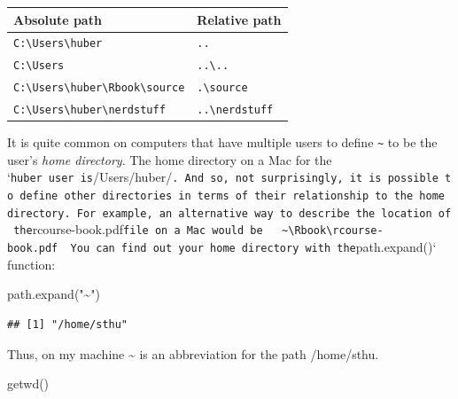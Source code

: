 \documentclass[
  12pt,
  oneside]{book}
\newenvironment{Shaded}{\begin{snugshade}}{\end{snugshade}}
\newcommand{\FunctionTok}[1]{\textcolor[rgb]{0.00,0.00,0.00}{#1}}
\newcommand{\NormalTok}[1]{#1}
\newcommand{\StringTok}[1]{\textcolor[rgb]{0.31,0.60,0.02}{#1}}
\theoremstyle{definition}
\theoremstyle{definition}
\theoremstyle{definition}
\theoremstyle{definition}
\theoremstyle{remark}
\begin{document}
\begin{longtable}[]{@{}ll@{}}
\toprule()
Absolute path & Relative path \\
\midrule()
\endhead
\texttt{C:\textbackslash{}Users\textbackslash{}huber} & \texttt{..} \\
\texttt{C:\textbackslash{}Users} & \texttt{..\textbackslash{}..} \\
\texttt{C:\textbackslash{}Users\textbackslash{}huber\textbackslash{}Rbook\textbackslash{}source} & \texttt{.\textbackslash{}source} \\
\texttt{C:\textbackslash{}Users\textbackslash{}huber\textbackslash{}nerdstuff} & \texttt{..\textbackslash{}nerdstuff} \\
\bottomrule()
\end{longtable}

It is quite common on computers that have multiple users to define \texttt{\textasciitilde{}} to be the user's \emph{home directory}. The home directory on a Mac for the `\texttt{huber\textquotesingle{}\textquotesingle{}\ user\ is}/Users/huber/\texttt{.\ And\ so,\ not\ surprisingly,\ it\ is\ possible\ to\ define\ other\ directories\ in\ terms\ of\ their\ relationship\ to\ the\ home\ directory.\ For\ example,\ an\ alternative\ way\ to\ describe\ the\ location\ of\ the}rcourse-book.pdf\texttt{file\ on\ a\ Mac\ would\ be\ \ \textasciigrave{}\textasciigrave{}\textasciigrave{}\ \textasciitilde{}\textbackslash{}Rbook\textbackslash{}rcourse-book.pdf\ \textasciigrave{}\textasciigrave{}\textasciigrave{}\ You\ can\ find\ out\ your\ home\ directory\ with\ the}path.expand()` function:

\begin{Shaded}
\begin{Highlighting}[]
\FunctionTok{path.expand}\NormalTok{(}\StringTok{"\textasciitilde{}"}\NormalTok{)}
\end{Highlighting}
\end{Shaded}

\begin{verbatim}
## [1] "/home/sthu"
\end{verbatim}

Thus, on my machine \textasciitilde{} is an abbreviation for the path /home/sthu.

\begin{Shaded}
\begin{Highlighting}[]
\FunctionTok{getwd}\NormalTok{()}
\end{Highlighting}
\end{Shaded}
\end{document}
